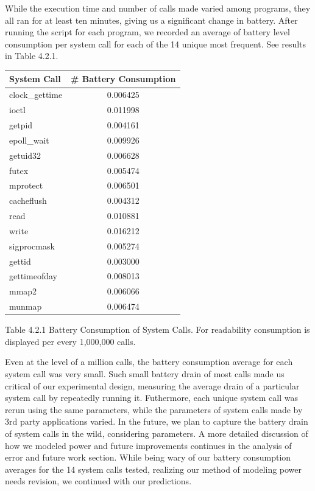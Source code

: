 \documentclass[11pt]{article}
\begin{document}
While the execution time and number of calls made varied among programs, they all ran for at least ten minutes, giving
us a significant change in battery. After running the script for each program, we recorded an average of battery level 
consumption per system call for each of the 14 unique most frequent.  See results in Table 4.2.1.

\begin{tabular}{l c}
   System Call & \# Battery Consumption \\
   \hline
   clock\_gettime & 0.006425 \\
   ioctl & 0.011998 \\
   getpid & 0.004161 \\
   epoll\_wait & 0.009926 \\      
   getuid32 & 0.006628 \\
   futex & 0.005474 \\
   mprotect & 0.006501 \\
   cacheflush & 0.004312 \\
   read & 0.010881 \\         
   write &  0.016212 \\        
   sigprocmask & 0.005274 \\
   gettid & 0.003000 \\
   gettimeofday & 0.008013 \\
   mmap2 & 0.006066 \\
   munmap &  0.006474\\              
\end{tabular}
\newline
{\fontsize{11}{13}\selectfont Table 4.2.1 Battery Consumption of System Calls. For readability consumption is displayed
per every 1,000,000 calls.}
\newline

Even at the level of a million calls, the battery consumption average for each system call was very small.  Such small battery drain of 
most calls made us critical of our experimental design, measuring the average drain of a particular system call by repeatedly running it.  
Futhermore, each unique system call was rerun using the same parameters, while the parameters of system calls made by 3rd party 
applications varied.  In the future, we plan to capture the battery drain of system calls in the wild, considering parameters.  A more detailed 
discussion of how we modeled power and future improvements continues in the analysis of error and future work section.  While being wary 
of our battery consumption averages for the 14 system calls tested, realizing our method of modeling power needs revision, we continued with our predictions.
\end{document}
